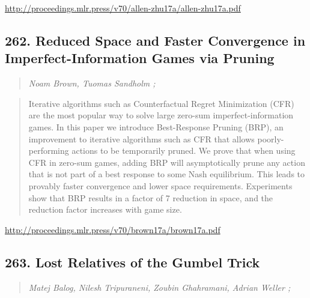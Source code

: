 \documentclass{article}
\begin{document}
\href{http://proceedings.mlr.press/v70/allen-zhu17a/allen-zhu17a.pdf}{http://proceedings.mlr.press/v70/allen-zhu17a/allen-zhu17a.pdf}

\subsection{262. Reduced Space and Faster Convergence in Imperfect-Information Games via Pruning}

\begin{quote}
\footnotesize{\textit{Noam Brown, Tuomas Sandholm ;}}

\end{quote}

\begin{quote}
    Iterative algorithms such as Counterfactual Regret Minimization (CFR) are the most popular way to solve large zero-sum imperfect-information games. In this paper we introduce Best-Response Pruning (BRP), an improvement to iterative algorithms such as CFR that allows poorly-performing actions to be temporarily pruned. We prove that when using CFR in zero-sum games, adding BRP will asymptotically prune any action that is not part of a best response to some Nash equilibrium. This leads to provably faster convergence and lower space requirements. Experiments show that BRP results in a factor of 7 reduction in space, and the reduction factor increases with game size.  
\end{quote}

\href{http://proceedings.mlr.press/v70/brown17a/brown17a.pdf}{http://proceedings.mlr.press/v70/brown17a/brown17a.pdf}

\subsection{263. Lost Relatives of the Gumbel Trick}

\begin{quote}
\footnotesize{\textit{Matej Balog, Nilesh Tripuraneni, Zoubin Ghahramani, Adrian Weller ;}}

\end{quote}
\end{document}
